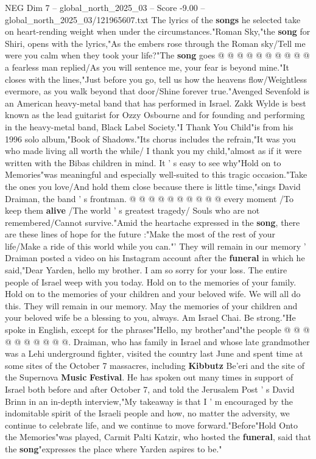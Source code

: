 \begin{textsample}{NEG Dim 7 – global\_north\_2025\_03 – Score -9.00 – global\_north\_2025\_03/121965607.txt}
The lyrics of the \textbf{songs} he selected take on heart-rending weight when under the circumstances."Roman Sky,"the \textbf{song} for Shiri, opens with the lyrics,"As the embers rose through the Roman sky/Tell me were you calm when they took your life?"The \textbf{song} goes @ @ @ @ @ @ @ @ @ @ a fearless man replied/As you will sentence me, your fear is beyond mine."It closes with the lines,"Just before you go, tell us how the heavens flow/Weightless evermore, as you walk beyond that door/Shine forever true."Avenged Sevenfold is an American heavy-metal band that has performed in Israel.
Zakk Wylde is best known as the lead guitarist for Ozzy Osbourne and for founding and performing in the heavy-metal band, Black Label Society."I Thank You Child"is from his 1996 solo album,"Book of Shadows."Its chorus includes the refrain,"It was you who made living all worth the while/ I thank you my child,"almost as if it were written with the Bibas children in mind.
It ' s easy to see why"Hold on to Memories"was meaningful and especially well-suited to this tragic occasion."Take the ones you love/And hold them close because there is little time,"sings David Draiman, the band ' s frontman. @ @ @ @ @ @ @ @ @ @ every moment /To keep them \textbf{alive} /The world ' s greatest tragedy/ Souls who are not remembered/Cannot survive."Amid the heartache expressed in the \textbf{song}, there are these lines of hope for the future :"Make the most of the rest of your life/Make a ride of this world while you can."' They will remain in our memory ' Draiman posted a video on his Instagram account after the \textbf{funeral} in which he said,"Dear Yarden, hello my brother.
I am so sorry for your loss.
The entire people of Israel weep with you today.
Hold on to the memories of your family.
Hold on to the memories of your children and your beloved wife.
We will all do this.
They will remain in our memory.
May the memories of your children and your beloved wife be a blessing to you, always.
Am Israel Chai.
Be strong."He spoke in English, except for the phrases"Hello, my brother"and"the people @ @ @ @ @ @ @ @ @ @.
Draiman, who has family in Israel and whose late grandmother was a Lehi underground fighter, visited the country last June and spent time at some sites of the October 7 massacres, including \textbf{Kibbutz} Be'eri and the site of the Supernova \textbf{Music} \textbf{Festival}.
He has spoken out many times in support of Israel both before and after October 7, and told the Jerusalem Post ' s David Brinn in an in-depth interview,"My takeaway is that I ' m encouraged by the indomitable spirit of the Israeli people and how, no matter the adversity, we continue to celebrate life, and we continue to move forward."Before"Hold Onto the Memories"was played, Carmit Palti Katzir, who hosted the \textbf{funeral}, said that the \textbf{song}"expresses the place where Yarden aspires to be."

\end{textsample}
